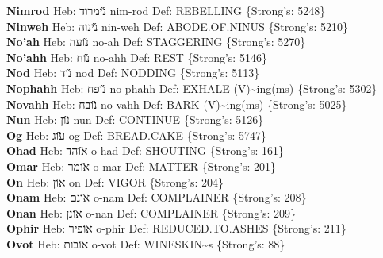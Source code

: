 {\textbf{Nimrod} Heb: {\large\H נימרוד} nim-rod Def: REBELLING \{Strong's: 5248\}\hfill{}\\

\textbf{Ninweh} Heb: {\large\H נינוה} nin-weh Def: ABODE.OF.NINUS \{Strong's: 5210\}\hfill{}\\

\textbf{No'ah} Heb: {\large\H נועה} no-ah Def: STAGGERING \{Strong's: 5270\}\hfill{}\\

\textbf{No'ahh} Heb: {\large\H נוח} no-ahh Def: REST \{Strong's: 5146\}\hfill{}\\

\textbf{Nod} Heb: {\large\H נוד} nod Def: NODDING \{Strong's: 5113\}\hfill{}\\

\textbf{Nophahh} Heb: {\large\H נופח} no-phahh Def: EXHALE (V)\textasciitilde{}ing(ms) \{Strong's: 5302\}\hfill{}\\

\textbf{Novahh} Heb: {\large\H נובח} no-vahh Def: BARK (V)\textasciitilde{}ing(ms) \{Strong's: 5025\}\hfill{}\\

\textbf{Nun} Heb: {\large\H נון} nun Def: CONTINUE \{Strong's: 5126\}\hfill{}\\

\textbf{Og} Heb: {\large\H עוג} og Def: BREAD.CAKE \{Strong's: 5747\}\hfill{}\\

\textbf{Ohad} Heb: {\large\H אוהד} o-had Def: SHOUTING \{Strong's: 161\}\hfill{}\\

\textbf{Omar} Heb: {\large\H אומר} o-mar Def: MATTER \{Strong's: 201\}\hfill{}\\

\textbf{On} Heb: {\large\H און} on Def: VIGOR \{Strong's: 204\}\hfill{}\\

\textbf{Onam} Heb: {\large\H אונם} o-nam Def: COMPLAINER \{Strong's: 208\}\hfill{}\\

\textbf{Onan} Heb: {\large\H אונן} o-nan Def: COMPLAINER \{Strong's: 209\}\hfill{}\\

\textbf{Ophir} Heb: {\large\H אופיר} o-phir Def: REDUCED.TO.ASHES \{Strong's: 211\}\hfill{}\\

\textbf{Ovot} Heb: {\large\H אובות} o-vot Def: WINESKIN\textasciitilde{}s \{Strong's: 88\}\hfill{}\\

}
